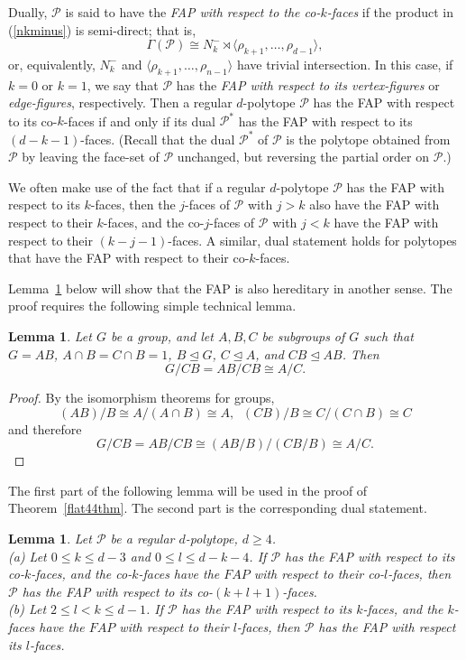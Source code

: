 \documentclass[10pt,a4paper]{amsart}
\newtheorem{lemma}[theorem]{Lemma}
\theoremstyle{definition}
\begin{document}
Dually, $\mathcal{P}$ is said to have the {\em FAP with respect to the co-$k$-faces\/} if the product in (\ref{nkminus}) is semi-direct; that is,
\[\Gamma(\mathcal{P}) \cong N_{k}^{-} \rtimes \langle\rho_{k+1},\ldots,\rho_{d-1}\rangle,\]
or, equivalently, $N_{k}^{-}$ and $\langle\rho_{k+1},\ldots,\rho_{n-1}\rangle$ have trivial intersection. In this case, if $k=0$ or $k=1$, we say that $\mathcal{P}$ has the {\em FAP with respect to its vertex-figures\/} or {\em edge-figures\/}, respectively. Then a regular $d$-polytope $\mathcal{P}$ has the FAP with respect to its co-$k$-faces if and only if its dual $\mathcal{P}^{*}$ has the FAP with respect to its $(d-k-1)$-faces.  (Recall that the dual $\mathcal{P}^{*}$ of $\mathcal{P}$ is the polytope obtained from $\mathcal{P}$ by leaving the face-set of $\mathcal{P}$ unchanged, but reversing the partial order on $\mathcal{P}$.)

We often make use of the fact that if a regular $d$-polytope $\mathcal{P}$ has the
FAP with respect to its $k$-faces, then the $j$-faces of $\mathcal{P}$ with $j>k$ also have the FAP with respect to their $k$-faces, and the co-$j$-faces of $\mathcal{P}$ with $j<k$ have the FAP with respect to their $(k-j-1)$-faces. A similar, dual statement holds for polytopes that have the FAP with respect to their co-$k$-faces.

Lemma~\ref{lemher} below will show that the FAP is also hereditary in another sense. The proof requires the following simple technical lemma.

\begin{lemma}
\label{lemABC}
Let $G$ be a group, and let $A,B,C$ be subgroups of $G$ such that $G=AB$, $A\cap B=C\cap B=1$, $B\unlhd G$, $C\unlhd A$, and $CB\unlhd AB$. Then 
\[ G/CB = AB/CB \cong A/C.\]
\end{lemma}

\begin{proof} 
By the isomorphism theorems for groups,
\[(AB)/B \cong A/(A\cap B) \cong A,\;\; (CB)/B \cong C/(C\cap B) \cong C\] 
and therefore
\[G/CB = AB/CB \cong (AB/B)/(CB/B)\cong A/C.\]
\end{proof}
\smallskip

The first part of the following lemma will be used in the proof of Theorem~\ref{flat44thm}. The second part is the corresponding dual statement.

\begin{lemma} 
\label{lemher}
Let $\mathcal{P}$ be a regular $d$-polytope, $d\geq 4$. \\[.03in]
(a) Let $0\leq k\leq d-3$ and $0\leq l\leq d-k-4$. If $\mathcal{P}$ has the FAP with respect to its co-$k$-faces, and the co-$k$-faces have the $FAP$ with respect to their co-$l$-faces, then $\mathcal{P}$ has the FAP with respect to its co-$(k+l+1)$-faces.\\[.03in]
(b) Let $2\leq l<k\leq d-1$. If $\mathcal{P}$ has the FAP with respect to its $k$-faces, and the $k$-faces have the $FAP$ with respect to their $l$-faces, then $\mathcal{P}$ has the FAP with respect its $l$-faces.
\end{lemma}
\end{document}
